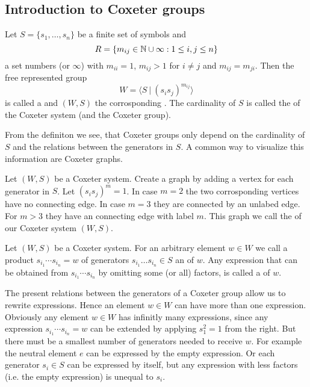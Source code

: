\subsection{Introduction to Coxeter groups}
\label{sec:coxeter-groups-introduction}

\begin{defi}
	Let $S = \{ s_1, \ldots, s_n \}$ be a finite set of symbols and
	$$R = \{ m_{ij} \in \mathbb{N} \cup \infty : 1 \leq i,j \leq n \}$$
	a set numbers (or $\infty$) with $m_{ii} = 1$, $m_{ij} > 1$ for $i \neq j$ and $m_{ij} = m_{ji}$. Then the free represented group
	$$W = \langle S \ | \ (s_i s_j)^{m_{ij}} \rangle$$
	is called a  and $(W,S)$ the corrosponding . The cardinality of $S$ is called the  of the Coxeter system (and the Coxeter group).
\end{defi}

From the definiton we see, that Coxeter groups only depend on the cardinality of $S$ and the relations between the generators in $S$. A common way to visualize this information are Coxeter graphs.

\begin{defi}
	Let $(W,S)$ be a Coxeter system. Create a graph by adding a vertex for each generator in $S$. Let $(s_i s_j)^m = 1$. In case $m = 2$ the two corrosponding vertices have no connecting edge. In case $m = 3$ they are connected by an unlabed edge. For $m > 3$ they have an connecting edge with label $m$. This graph we call the  of our Coxeter system $(W,S)$.
\end{defi}

\begin{defi}
	Let $(W,S)$ be a Coxeter system. For an arbitrary element $w \in W$ we call a product $s_{i_1} \cdots s_{i_n} = w$ of generators $s_{i_1} \ldots s_{i_n} \in S$ an  of $w$. Any expression that can be obtained from $s_{i_1} \cdots s_{i_n}$ by omitting some (or all) factors, is called a  of $w$.
\end{defi}

The present relations between the generators of a Coxeter group allow us to rewrite expressions. Hence an element $w \in W$ can have more than one expression. Obviously any element $w \in W$ has infinitly many expressions, since any expression $s_{i_1} \cdots s_{i_n} = w$ can be extended by applying $s_1^2 = 1$ from the right. But there must be a smallest number of generators needed to receive $w$. For example the neutral element $e$ can be expressed by the empty expression. Or each generator $s_i \in S$ can be expressed by itself, but any expression with less factors (i.e. the empty expression) is unequal to $s_i$.


